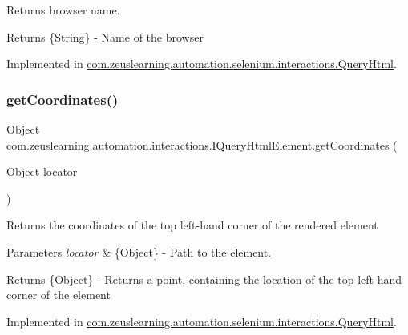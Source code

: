 Returns browser name.

\begin{DoxyReturn}{Returns}
\{String\} -\/ Name of the browser 
\end{DoxyReturn}


Implemented in \hyperlink{classcom_1_1zeuslearning_1_1automation_1_1selenium_1_1interactions_1_1QueryHtml_a2a5f98d1135bb2e136ed1a6acef3f21f}{com.\+zeuslearning.\+automation.\+selenium.\+interactions.\+Query\+Html}.

\hypertarget{interfacecom_1_1zeuslearning_1_1automation_1_1interactions_1_1IQueryHtmlElement_a7e632b8b3ccb6f9446e65dcf961d5d9a}{}\label{interfacecom_1_1zeuslearning_1_1automation_1_1interactions_1_1IQueryHtmlElement_a7e632b8b3ccb6f9446e65dcf961d5d9a} 
\subsubsection{\texorpdfstring{get\+Coordinates()}{getCoordinates()}}
{\footnotesize\ttfamily Object com.\+zeuslearning.\+automation.\+interactions.\+I\+Query\+Html\+Element.\+get\+Coordinates (\begin{DoxyParamCaption}\item[{Object}]{locator }\end{DoxyParamCaption})}

Returns the coordinates of the top left-\/hand corner of the rendered element


\begin{DoxyParams}{Parameters}
{\em locator} & \{Object\} -\/ Path to the element. \\
\hline
\end{DoxyParams}
\begin{DoxyReturn}{Returns}
\{Object\} -\/ Returns a point, containing the location of the top left-\/hand corner of the element 
\end{DoxyReturn}


Implemented in \hyperlink{classcom_1_1zeuslearning_1_1automation_1_1selenium_1_1interactions_1_1QueryHtml_a52ce1e529bfd5416349e82671c33e480}{com.\+zeuslearning.\+automation.\+selenium.\+interactions.\+Query\+Html}.

